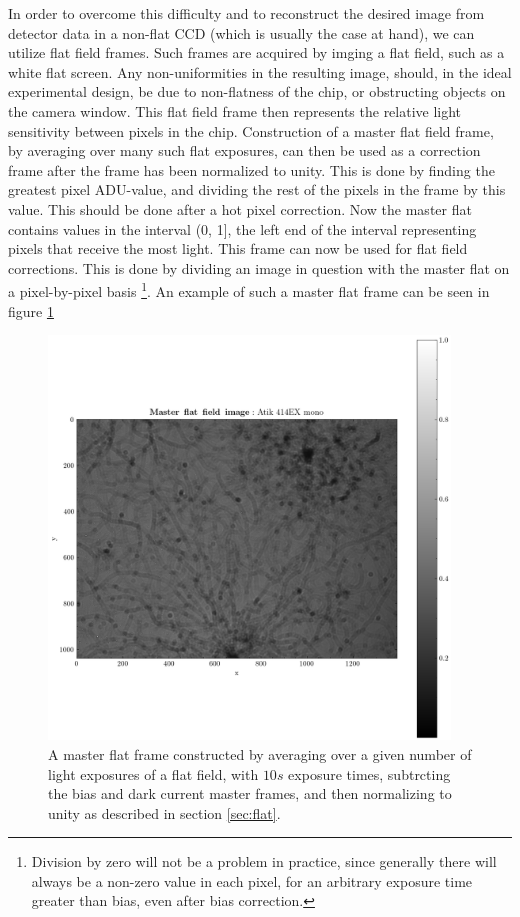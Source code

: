 \documentclass[../main.tex]{subfiles}
\begin{document}
	In order to overcome this difficulty and to reconstruct the desired image from detector data in a non-flat CCD (which is usually the case at hand), we can utilize flat field frames. Such frames are acquired by imging a flat field, such as a white flat screen. Any non-uniformities in the resulting image, should, in the ideal experimental design, be due to non-flatness of the chip, or obstructing objects on the camera window. This flat field frame then represents the relative light sensitivity between pixels in the chip. Construction of a master flat field frame, by averaging over many such flat exposures, can then be used as a correction frame after the frame has been normalized to unity. This is done by finding the greatest pixel ADU-value, and dividing the rest of the pixels in the frame by this value. This should be done after a hot pixel correction. Now the master flat contains values in the interval (0, 1], the left end of the interval representing pixels that receive the most light. This frame can now be used for flat field corrections. This is done by dividing an image in question with the master flat on a pixel-by-pixel basis \footnote{Division by zero will not be a problem in practice, since generally there will always be a non-zero value in each pixel, for an arbitrary exposure time greater than bias, even after bias correction.}. An example of such a master flat frame can be seen in figure \ref{fig:masterflat}
	
		\begin{figure}[h!]
		\centering
		\includegraphics[width	=0.95\textwidth]{master_flat.png}
		\caption{A master flat frame constructed by averaging over a given number of light exposures of a flat field, with $10s$ exposure times, subtrcting the bias and dark current master frames, and then normalizing to unity as described in section \ref{sec:flat}. }
		\label{fig:masterflat}
	\end{figure}
	
\end{document}
